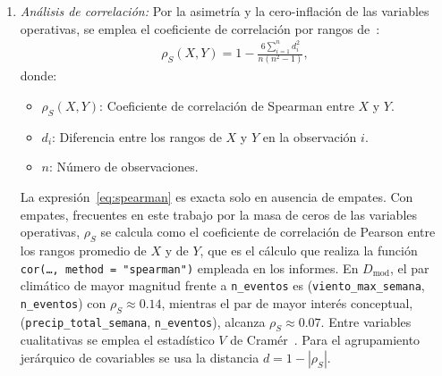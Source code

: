 \begin{enumerate}
    \item \textit{Análisis de correlación:}
    Por la asimetría y la cero-inflación de las variables operativas, se emplea el coeficiente de correlación por rangos de~\cite{ref53}:
    \begin{equation}
        \begin{aligned}
        \rho_S(X, Y) = 1 - \frac{6 \sum_{i=1}^{n} d_i^{2}}{n\left(n^{2} - 1\right)},
        \end{aligned}
        \label{eq:spearman}
    \end{equation}
    donde:
    \begin{itemize}
        \item $\rho_S(X, Y)$: Coeficiente de correlación de Spearman entre $X$ y $Y$.
        \item $d_i$: Diferencia entre los rangos de $X$ y $Y$ en la observación $i$.
        \item $n$: Número de observaciones.
    \end{itemize}
    La expresión~\eqref{eq:spearman} es exacta solo en ausencia de empates. Con empates, frecuentes en este trabajo por la masa de ceros de las variables operativas, $\rho_S$ se calcula como el coeficiente de correlación de Pearson entre los rangos promedio de $X$ y de $Y$, que es el cálculo que realiza la función \texttt{cor(\ldots, method = "spearman")} empleada en los informes.
    En $D_{\mathrm{mod}}$, el par climático de mayor magnitud frente a \texttt{n\_eventos} es (\texttt{viento\_max\_semana}, \texttt{n\_eventos}) con $\rho_S\approx 0{.}14$, mientras el par de mayor interés conceptual, (\texttt{precip\_total\_semana}, \texttt{n\_eventos}), alcanza $\rho_S\approx 0{.}07$. Entre variables cualitativas se emplea el estadístico $V$ de Cramér~\cite{ref54}. Para el agrupamiento jerárquico de covariables se usa la distancia $d=1-|\rho_S|$.


\end{enumerate}
